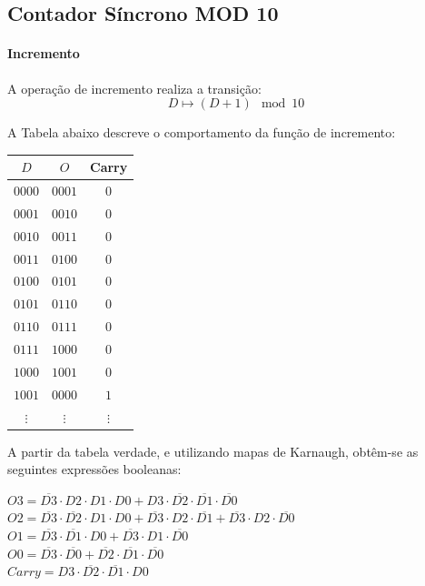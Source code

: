 \subsection{Contador Síncrono MOD 10}

\paragraph{Incremento}

A operação de incremento realiza a transição:
\[
D \mapsto (D + 1) \mod 10
\]


A Tabela abaixo descreve o comportamento da função de incremento:

\begin{center}
\begin{tabular}{c|cc}
$D$ & $O$ & Carry \\
\hline
$0000$ & $0001$ & $0$ \\
$0001$ & $0010$ & $0$ \\
$0010$ & $0011$ & $0$ \\
$0011$ & $0100$ & $0$ \\
$0100$ & $0101$ & $0$ \\
$0101$ & $0110$ & $0$ \\
$0110$ & $0111$ & $0$ \\
$0111$ & $1000$ & $0$ \\
$1000$ & $1001$ & $0$ \\
$1001$ & $0000$ & $1$ \\
$\vdots$ & $\vdots$ & $\vdots$ \\
\end{tabular}
\end{center}

A partir da tabela verdade, e utilizando mapas de Karnaugh, obtêm-se as seguintes expressões booleanas:

$O3 =  \overline{D3}  \cdot D2 \cdot D1 \cdot D0+D3 \cdot  \overline{D2}  \cdot  \overline{D1}  \cdot  \overline{D0} $~\\
$O2 =  \overline{D3}  \cdot  \overline{D2}  \cdot D1 \cdot D0+ \overline{D3}  \cdot D2 \cdot  \overline{D1} + \overline{D3}  \cdot D2 \cdot  \overline{D0} $~\\
$O1 =  \overline{D3}  \cdot  \overline{D1}  \cdot D0+ \overline{D3}  \cdot D1 \cdot  \overline{D0} $~\\
$O0 =  \overline{D3}  \cdot  \overline{D0} + \overline{D2}  \cdot  \overline{D1}  \cdot  \overline{D0} $~\\
$Carry = D3 \cdot  \overline{D2}  \cdot  \overline{D1}  \cdot D0$~\\

